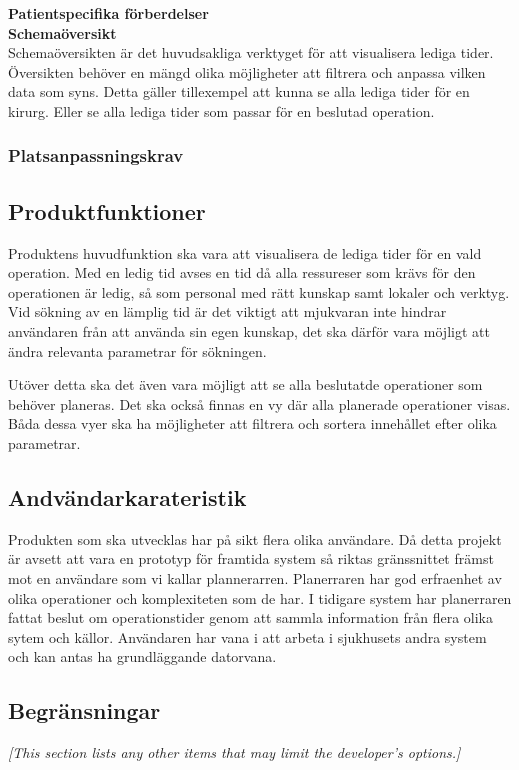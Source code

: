 \documentclass{article}
\begin{document}
\begin{enumerate}
\textbf{Patientspecifika förberdelser}\\
\textbf{Schemaöversikt}\\
Schemaöversikten är det huvudsakliga verktyget för att visualisera lediga tider.
Översikten behöver en mängd olika möjligheter att filtrera och anpassa vilken
data som syns. Detta gäller tillexempel att kunna se alla lediga tider för en
kirurg. Eller se alla lediga tider som passar för en beslutad operation.\\


\subsubsection{Platsanpassningskrav}
\label{subsec:Platsanpassningskrav}
\subsection{Produktfunktioner}
\label{subsec:Produktfunktioner}
Produktens huvudfunktion ska vara att visualisera de lediga tider för en vald
operation. Med en ledig tid avses en tid då alla ressureser som krävs för den
operationen är ledig, så som personal med rätt kunskap samt lokaler och verktyg.
Vid sökning av en lämplig tid är det viktigt att mjukvaran inte hindrar
användaren från att använda sin egen kunskap, det ska därför vara möjligt att
ändra relevanta parametrar för sökningen.

Utöver detta ska det även vara möjligt att se alla beslutatde operationer som
behöver planeras. Det ska också finnas en vy där alla planerade operationer
visas. Båda dessa vyer ska ha möjligheter att filtrera och sortera innehållet
efter olika parametrar.
\subsection{Andvändarkarateristik}
\label{subsec:Andvandarkarateristik}
Produkten som ska utvecklas har på sikt flera olika användare. Då detta
projekt är avsett att vara en prototyp för framtida system så riktas gränssnittet
främst mot en användare som vi kallar plannerarren. Planerraren har god
erfraenhet av olika operationer och komplexiteten som de har. I tidigare system
har planerraren fattat beslut om operationstider genom att sammla information
från flera olika sytem och källor. Användaren har vana i att arbeta i sjukhusets
andra system och kan antas ha grundläggande datorvana.

\subsection{Begränsningar}
\label{subsec:Begransningar}
\emph{[This section lists any other items that may limit the developer's
  options.]}



\end{enumerate}
\end{document}
